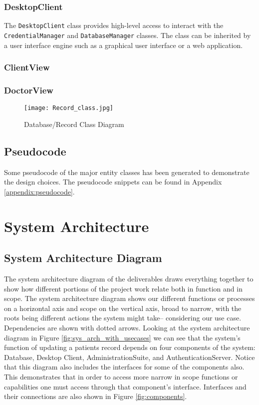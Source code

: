 \documentclass[a4paper, 11pt]{article}
\begin{document}
\subsubsection{DesktopClient}
The \texttt{DesktopClient} class provides high-level access to interact with the \texttt{CredentialManager} and \texttt{DatabaseManager} classes. The class can be inherited by a user interface engine such as a graphical user interface or a web application.

\subsubsection{ClientView}
\subsubsection{DoctorView}

\begin{figure}[!htb]
    \centering
    \texttt{[image: Record\_class.jpg]}
    \caption{Database/Record Class Diagram}
    \label{fig:Record_class}
\end{figure}

\subsection{Pseudocode}
Some pseudocode of the major entity classes has been generated to demonstrate the design choices. The pseudocode snippets can be found in Appendix \ref{appendix:pseudocode}.

\newpage
\section{System Architecture}
\subsection{System Architecture Diagram}
The system architecture diagram of the deliverables draws everything together to show how different portions of the project work relate both in function and in scope. The system architecture diagram shows our different functions or processes on a horizontal axis and scope on the vertical axis, broad to narrow, with the roots being different actions the system might take-- considering our use case. Dependencies are shown with dotted arrows. Looking at the system architecture diagram in Figure \ref{fig:sys_arch_with_usecases} we can see that the system's function of updating a patients record depends on four components of the system: Database, Desktop Client, AdministrationSuite, and AuthenticationServer. Notice that this diagram also includes the interfaces for some of the components also. This demonstrates that in order to access more narrow in scope functions or capabilities one must access through that component's interface. Interfaces and their connections are also shown in Figure \ref{fig:components}.
\end{document}
